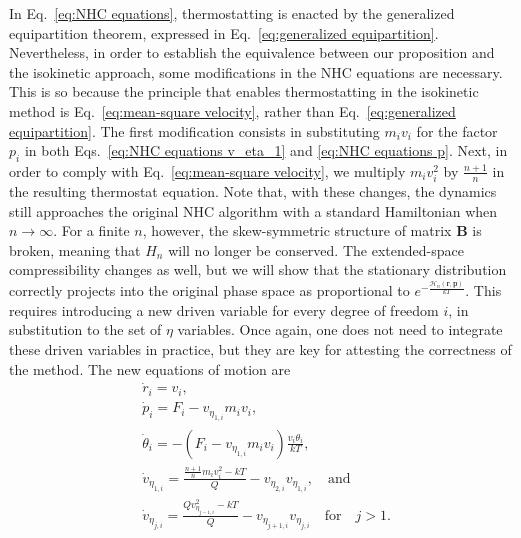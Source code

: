 \documentclass[
aip,
jcp,
reprint,
]{revtex4-1}
\newcommand{\mt}[1]{\boldsymbol{\mathbf{#1}}}          %
\newcommand{\vt}[1]{\boldsymbol{\mathbf{#1}}}          %
\newcommand{\nn}{n}
\begin{document}
In Eq.~\eqref{eq:NHC equations}, thermostatting is enacted by the generalized equipartition theorem, expressed in Eq.~\eqref{eq:generalized equipartition}.
Nevertheless, in order to establish the equivalence between our proposition and the isokinetic approach, some modifications in the NHC equations are necessary.
This is so because the principle that enables thermostatting in the isokinetic method is Eq.~\eqref{eq:mean-square velocity}, rather than Eq.~\eqref{eq:generalized equipartition}.
The first modification consists in substituting $m_i v_i$ for the factor $p_i$ in both Eqs.~\eqref{eq:NHC equations v_eta_1} and \eqref{eq:NHC equations p}.
Next, in order to comply with Eq.~\eqref{eq:mean-square velocity}, we multiply $m_i v_i^2$ by $\frac{\nn+1}{\nn}$ in the resulting thermostat equation.
Note that, with these changes, the dynamics still approaches the original NHC algorithm with a standard Hamiltonian when $\nn \to \infty$.
For a finite $\nn$, however, the skew-symmetric structure of matrix $\mt B$ is broken, meaning that $H_n$ will no longer be conserved.
The extended-space compressibility changes as well, but we will show that the stationary distribution correctly projects into the original phase space as proportional to $e^{-\frac{\mathcal{H}_n(\vt r, \vt p)}{kT}}$.
This requires introducing a new driven variable for every degree of freedom $i$, in substitution to the set of $\eta$ variables.
Once again, one does not need to integrate these driven variables in practice, but they are key for attesting the correctness of the method.
The new equations of motion are
\begin{subequations}
	\label{eq:isokinetic NHC equations}
	\begin{align}
	&\dot{r}_i = v_i, \\
	&\dot{p}_i = F_i - v_{\eta_{1,i}} m_i v_i, \label{eq:isokinetic NHC equations p} \\
	&\dot{\theta}_i = -\left(F_i - v_{\eta_{1,i}} m_i v_i\right)\frac{v_i \theta_i}{k T}, \label{eq:isokinetic NHC equations theta} \\
	&\dot{v}_{\eta_{1, i}} = \frac{\frac{\nn+1}{\nn} m_i v_i^2 - kT}{Q} - v_{\eta_{2, i}} v_{\eta_{1, i}}, \quad \mathrm{and} \label{eq:isokinetic NHC equations v_eta_1} \\
	&\dot{v}_{\eta_{j, i}} = \frac{Q v_{\eta_{j-1, i}}^2 - kT}{Q} - v_{\eta_{j+1, i}} v_{\eta_{j, i}} \quad \mathrm{for} \quad j > 1. \label{eq:adapted NHC equations v_eta_j}
	\end{align}
\end{subequations}
\end{document}
